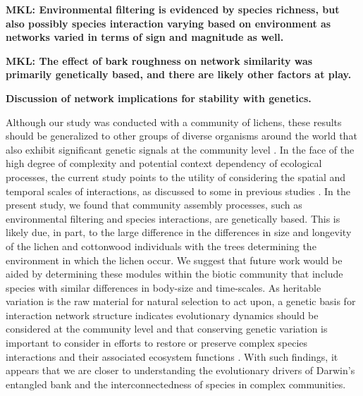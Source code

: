 \documentclass[11pt,twocolumn,twoside,lineno]{pnas-new}
\begin{document}
\textbf{MKL: Environmental filtering is evidenced by species richness,
  but also possibly species interaction varying based on environment
  as networks varied in terms of sign and magnitude as well.}

\textbf{MKL: The effect of bark roughness on network similarity was
  primarily genetically based, and there are likely other factors at
  play.}

\textbf{Discussion of network implications for stability with genetics.}

Although our study was conducted with a community of lichens, these
results should be generalized to other groups of diverse organisms
around the world that also exhibit significant genetic signals at the
community level \cite{Rowntree2011, Whitham2012}. In the face of the
high degree of complexity and potential context dependency of
ecological processes, the current study points to the utility of
considering the spatial and temporal scales of interactions, as
discussed to some in previous studies \cite{Bangert2006, Zook2010,
  Zytynska2012}. In the present study, we found that community
assembly processes, such as environmental filtering and species
interactions, are genetically based. This is likely due, in part, to
the large difference in the differences in size and longevity of the
lichen and cottonwood individuals with the trees determining the
environment in which the lichen occur. We suggest that future work
would be aided by determining these modules within the biotic
community that include species with similar differences in body-size
and time-scales. As heritable variation is the raw material for
natural selection to act upon, a genetic basis for interaction network
structure indicates evolutionary dynamics should be considered at the
community level and that conserving genetic variation is important to
consider in efforts to restore or preserve complex species
interactions and their associated ecosystem functions
\cite{Evans2013}.  With such findings, it appears that we are closer
to understanding the evolutionary drivers of Darwin's entangled bank
and the interconnectedness of species in complex communities.



\end{document}
